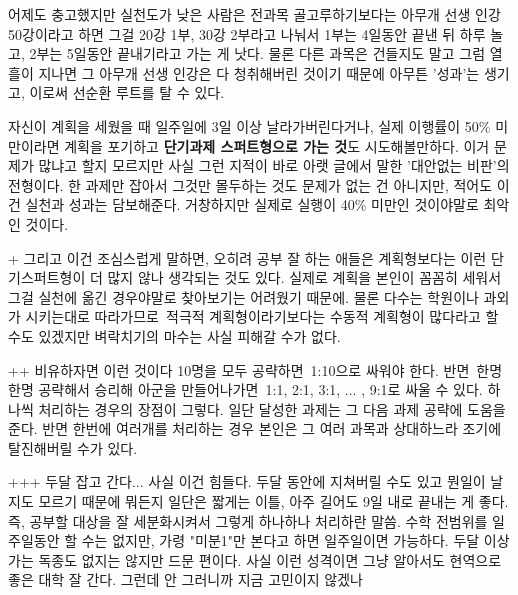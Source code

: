 어제도 충고했지만 실천도가 낮은 사람은 전과목 골고루하기보다는
아무개 선생 인강 50강이라고 하면 그걸 20강 1부, 30강 2부라고 나눠서
1부는 4일동안 끝낸 뒤 하루 놀고, 2부는 5일동안 끝내기라고 가는 게 낫다. 물론 다른 과목은 건들지도 말고
그럼 열흘이 지나면 그 아무개 선생 인강은 다 청취해버린 것이기 때문에 아무튼 '성과'는 생기고, 이로써 선순환 루트를 탈 수 있다.
\vspace{5mm}

자신이 계획을 세웠을 때 일주일에 3일 이상 날라가버린다거나, 실제 이행률이 50$\%$ 미만이라면
계획을 포기하고 \textbf{단기과제 스퍼트형으로 가는 것}도 시도해볼만하다.
이거 문제가 많냐고 할지 모르지만 사실 그런 지적이 바로 아랫 글에서 말한 '대안없는 비판'의 전형이다.
한 과제만 잡아서 그것만 몰두하는 것도 문제가 없는 건 아니지만, 적어도 이건 실천과 성과는 담보해준다.
거창하지만 실제로 실행이 40$\%$ 미만인 것이야말로 최악인 것이다.
\vspace{5mm}

+ 그리고 이건 조심스럽게 말하면, 오히려 공부 잘 하는 애들은 계획형보다는 이런 단기스퍼트형이 더 많지 않나 생각되는 것도 있다.
실제로 계획을 본인이 꼼꼼히 세워서 그걸 실천에 옮긴 경우야말로 찾아보기는 어려웠기 때문에.
물론 다수는 학원이나 과외가 시키는대로 따라가므로 적극적 계획형이라기보다는 수동적 계획형이 많다라고 할 수도 있겠지만
벼락치기의 마수는 사실 피해갈 수가 없다.
\vspace{5mm}

++ 비유하자면 이런 것이다 10명을 모두 공략하면 1:10으로 싸워야 한다.
반면 한명한명 공략해서 승리해 아군을 만들어나가면 1:1, 2:1, 3:1, ... , 9:1로 싸울 수 있다.
하나씩 처리하는 경우의 장점이 그렇다. 일단 달성한 과제는 그 다음 과제 공략에 도움을 준다.
반면 한번에 여러개를 처리하는 경우 본인은 그 여러 과목과 상대하느라 조기에 탈진해버릴 수가 있다.
\vspace{5mm}

+++ 두달 잡고 간다... 사실 이건 힘들다. 두달 동안에 지쳐버릴 수도 있고 뭔일이 날지도 모르기 때문에
뭐든지 일단은 짧게는 이틀, 아주 길어도 9일 내로 끝내는 게 좋다. 즉, 공부할 대상을 잘 세분화시켜서 그렇게 하나하나 처리하란 말씀.
수학 전범위를 일주일동안 할 수는 없지만, 가령 "미분1"만 본다고 하면 일주일이면 가능하다.
두달 이상 가는 독종도 없지는 않지만 드문 편이다. 사실 이런 성격이면 그냥 알아서도 현역으로 좋은 대학 잘 간다.
그런데 안 그러니까 지금 고민이지 않겠나
\vspace{5mm}












